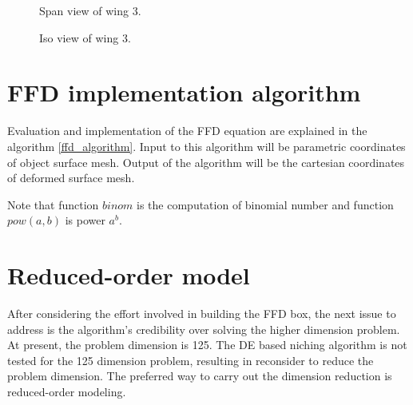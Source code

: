 \begin{figure}[!ht]
    \parbox{0.47\linewidth}
    {
    \centering
    \caption{Span view of wing 3.}
    \label{wing3_span}
    }
    \parbox{0.47\linewidth}
    {
    \centering
    \caption{Iso view of wing 3.}
    \label{wing3_iso}
    }
\end{figure}
\section{FFD implementation algorithm}
Evaluation and implementation of the FFD equation are explained in the algorithm \ref{ffd_algorithm}. Input to this algorithm will be parametric coordinates of object surface mesh. Output of the algorithm will be the cartesian coordinates of deformed surface mesh.


Note that function $binom$ is the computation of binomial number and function $pow(a, b)$ is power $a^b$.

\section{Reduced-order model}
After considering the effort involved in building the FFD box, the next issue to address is the algorithm's credibility over solving the higher dimension problem. At present, the problem dimension is 125. The DE based niching algorithm is not tested for the 125 dimension problem, resulting in reconsider to reduce the problem dimension. The preferred way to carry out the dimension reduction is reduced-order modeling.

